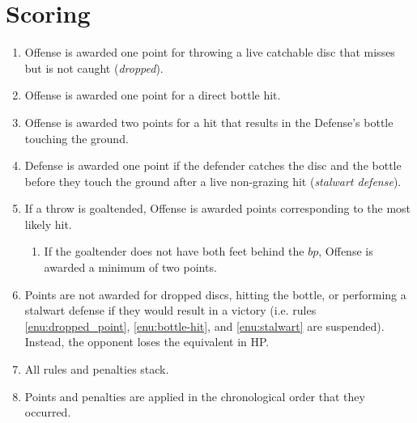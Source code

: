 \documentclass[11pt,letterpaper,twocolumn,english,DIV=calc]{scrartcl}
\begin{document}
\section{Scoring}
\begin{enumerate}
	\item \label{enu:dropped_point}Offense is awarded one point for throwing a live catchable disc that misses but is not caught (\emph{dropped}). 
	\item \label{enu:bottle-hit}Offense is awarded one point for a direct bottle hit.
	\item Offense is awarded two points for a hit that results in the Defense's bottle touching the ground.
	\item \label{enu:stalwart}Defense is awarded one point if the defender catches the disc and the bottle before they touch the ground after a live non-grazing hit (\emph{stalwart defense}). 

	\item If a throw is goaltended, Offense is awarded points corresponding to the most likely hit.
	\begin{enumerate}
		\item If the goaltender does not have both feet behind the $bp$, Offense is awarded a minimum of two points.
	\end{enumerate}

	\item Points are not awarded for dropped discs, hitting the bottle, or performing a stalwart defense if they would result in a victory (i.e. rules \ref{enu:dropped_point}, \ref{enu:bottle-hit}, and \ref{enu:stalwart} are suspended). Instead, the opponent loses the equivalent in HP.

	\item All rules and penalties stack.
	\item Points and penalties are applied in the chronological order that they occurred.
\end{enumerate}
\end{document}
